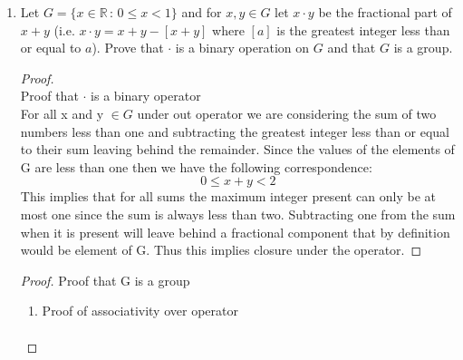 \documentclass[11pt]{article}
\theoremstyle{definition}  %
\newcommand{\Z}{\mathbb{Z}}
\newcommand{\R}{\mathbb{R}}
\begin{document}
\begin{enumerate}
\begin{itemize}
     \\
     Let G be the following set:
     \[
       G=\left\{\frac{m}{n},n\neq0,k,m\in \Z, |\frac{m}{n}|>1\right\}\cup \{0\}
     \]
     \begin{proof}
       Due to the construction of G taking the absolute value over each of its elements this opens weaknesses in the closure of the binary operator. We can easily pick negative values less than -1 and show that under addition with a positive element that we can arrive at a value less than 1 when the difference between our selection of a and b is satisfactory:
       \[
         a=\frac{-5}{3}\quad b=\frac{3}{2}
       \]
       \[
         a+b=\frac{-5}{3}+\frac{3}{2}=\frac{-1}{6}\notin G
       \]
       Thus, again, since we fail under closure of the binary operator the set G does \textbf{not} form a group under the operator of addition
     \end{proof}
   \end{itemize}
 \item Let $G = \{x \in \R \, : \, 0 \leq x < 1\}$ and for $x,y \in G$ let $x \cdot y$ be the fractional part of $x + y$ (i.e. $ x \cdot y = x + y - [x+y]$ where $[a]$ is the greatest
   integer less than or equal to $a$). Prove that $\cdot$ is a binary operation on $G$ and that $G$ is a group.
   \begin{proof}\\
     Proof that $\cdot$ is a binary operator\\
     For all x and y $\in G$ under out operator we are considering the sum of two numbers less than one and subtracting the greatest integer less than or equal to their sum leaving behind the remainder. Since the values of the elements of G are less than one then we have the following correspondence:
     \[
       0\leq x+y<2
     \]
     This implies that for all sums the maximum integer present can only be at most one since the sum is always less than two. Subtracting one from the sum when it is present will leave behind a fractional component that by definition would be element of G. Thus this implies closure under the operator.
   \end{proof}
   \begin{proof} Proof that G is a group
     \begin{enumerate}
       \item Proof of associativity over operator\\
       \begin{align*}

\end{align*}
\end{enumerate}
\end{proof}
\end{enumerate}
\end{document}
